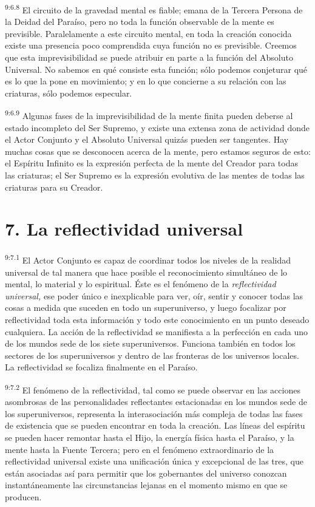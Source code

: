 \par
\textsuperscript{9:6.8} El circuito de la gravedad mental es fiable; emana de la Tercera Persona de la Deidad del Paraíso, pero no toda la función observable de la mente es previsible. Paralelamente a este circuito mental, en toda la creación conocida existe una presencia poco comprendida cuya función no es previsible. Creemos que esta imprevisibilidad se puede atribuir en parte a la función del Absoluto Universal. No sabemos en qué consiste esta función; sólo podemos conjeturar qué es lo que la pone en movimiento; y en lo que concierne a su relación con las criaturas, sólo podemos especular.

\par
\textsuperscript{9:6.9} Algunas fases de la imprevisibilidad de la mente finita pueden deberse al estado incompleto del Ser Supremo, y existe una extensa zona de actividad donde el Actor Conjunto y el Absoluto Universal quizás pueden ser tangentes. Hay muchas cosas que se desconocen acerca de la mente, pero estamos seguros de esto: el Espíritu Infinito es la expresión perfecta de la mente del Creador para todas las criaturas; el Ser Supremo es la expresión evolutiva de las mentes de todas las criaturas para su Creador.

\section*{7. La reflectividad universal}
\par
\textsuperscript{9:7.1} El Actor Conjunto es capaz de coordinar todos los niveles de la realidad universal de tal manera que hace posible el reconocimiento simultáneo de lo mental, lo material y lo espiritual. Éste es el fenómeno de la \textit{reflectividad universal,} ese poder único e inexplicable para ver, oír, sentir y conocer todas las cosas a medida que suceden en todo un superuniverso, y luego focalizar por reflectividad toda esta información y todo este conocimiento en un punto deseado cualquiera. La acción de la reflectividad se manifiesta a la perfección en cada uno de los mundos sede de los siete superuniversos. Funciona también en todos los sectores de los superuniversos y dentro de las fronteras de los universos locales. La reflectividad se focaliza finalmente en el Paraíso.

\par
\textsuperscript{9:7.2} El fenómeno de la reflectividad, tal como se puede observar en las acciones asombrosas de las personalidades reflectantes estacionadas en los mundos sede de los superuniversos, representa la interasociación más compleja de todas las fases de existencia que se pueden encontrar en toda la creación. Las líneas del espíritu se pueden hacer remontar hasta el Hijo, la energía física hasta el Paraíso, y la mente hasta la Fuente Tercera; pero en el fenómeno extraordinario de la reflectividad universal existe una unificación única y excepcional de las tres, que están asociadas así para permitir que los gobernantes del universo conozcan instantáneamente las circunstancias lejanas en el momento mismo en que se producen.

